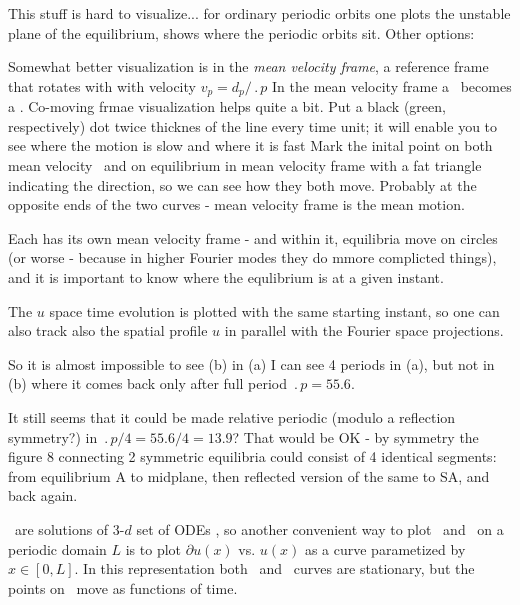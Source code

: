 This stuff is hard to visualize... for ordinary periodic orbits one
plots the unstable plane of the equilibrium, shows where the periodic
orbits sit. Other options:

Somewhat better visualization is in the
{\em mean velocity frame}, {\ie} 
a reference frame that rotates with with velocity 
$v_p=d_p/\period{p}$
In the mean velocity frame a \rpo\ becomes
a \po.
Co-moving frmae visualization helps quite a bit. Put a black (green, respectively) dot
twice thicknes of the line every time unit; it will enable you to see
where the motion is slow and where it is fast
Mark the inital point on both
mean velocity \rpo\ and on equilibrium in mean velocity
 frame with a fat triangle
indicating the direction, so we can see how they both move. Probably at the
opposite ends of the two curves - mean velocity frame is the mean motion.


Each {\rpo} has its own mean velocity frame - and within it, equilibria
move on circles (or worse - because in higher Fourier modes they do mmore
complicted things), and it is important to know where the equlibrium is at
a given instant.

The $u$ space time evolution  %
is plotted with the same starting instant,
so one can also track also the spatial profile $u$ in parallel with
the Fourier space projections.

So it is almost impossible to see (b) %
in (a) %
I can see 4 periods in (a), %
but not in (b) %
where it comes back only after full period $\period{p}=55.6$.

It still seems that it could be made relative periodic 
(modulo a reflection symmetry?)
in $\period{p}/4=55.6/4=13.9$? That would be OK 
-
by symmetry the figure 8 connecting
2 symmetric equilibria could consist of 4 identical segments: from
equilibrium A to midplane, then reflected version of the same to SA, and
back again.

\Eqv\ are solutions of 3-$d$ set of ODEs  , so
another convenient way to plot \eqva\ and \reqva\ on a periodic
domain $L$ is to plot 
$\partial u(x)$ vs. $u(x)$ as a curve parametized by
$x\in [0,L]$. In this representation both \eqva\ and \reqva\ curves are
stationary, but the points on \reqva\ move as functions of time.

